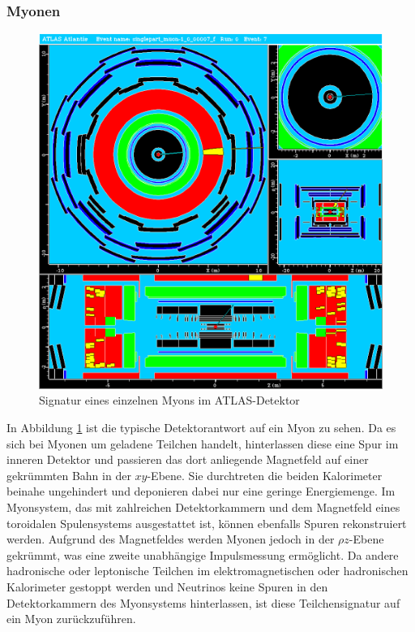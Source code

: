 \documentclass[11pt, a4paper]{article}
\numberwithin{equation}{section}
\begin{document}
\subsubsection{Myonen}
\begin{figure}[htbp]
	\centering
	\includegraphics[width=1.0\textwidth]{./data/atlantis/singlepart_events_new/muon/single_track2.png}
	\caption{Signatur eines einzelnen Myons im ATLAS-Detektor}
	\label{fig:myon-singletrack}
\end{figure}
\vfill
\noindent
In Abbildung \ref{fig:myon-singletrack} ist die typische Detektorantwort auf ein Myon zu sehen.
Da es sich bei Myonen um geladene Teilchen handelt, hinterlassen diese eine Spur im inneren Detektor und passieren das dort anliegende Magnetfeld auf einer gekrümmten Bahn in der $xy$-Ebene.
Sie durchtreten die beiden Kalorimeter beinahe ungehindert und deponieren dabei nur eine geringe Energiemenge.
Im Myonsystem, das mit zahlreichen Detektorkammern und dem Magnetfeld eines toroidalen Spulensystems ausgestattet ist, können ebenfalls Spuren rekonstruiert werden.
Aufgrund des Magnetfeldes werden Myonen jedoch in der $\rho z$-Ebene gekrümmt, was eine zweite unabhängige Impulsmessung ermöglicht.
Da andere hadronische oder leptonische Teilchen im elektromagnetischen oder hadronischen Kalorimeter gestoppt werden und Neutrinos keine Spuren in den Detektorkammern des Myonsystems hinterlassen, ist diese Teilchensignatur auf ein Myon zurückzuführen. 
\vfill
\end{document}
